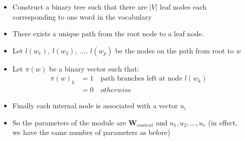 \begin{frame}
	\begin{columns}
		\begin{overlayarea}{\textwidth}{\textheight}
			
		\end{overlayarea}
		\begin{overlayarea}{\textwidth}{\textheight}
			\footnotesize{
				\begin{itemize}
					\justifying
					\item<1-> Construct a binary tree such that there are $|V|$ leaf nodes each corresponding
					      to one word in the vocabulary
					\item<3-> There exists a unique path from the root node to a leaf node.
					\item<4-> Let $l(w_1),\ l(w_2),\ ...,\ l(w_p)$ be the nodes on the path from root to $w$
					\item<5-> Let $\pi(w)$ be a binary vector such that:
					      \footnotesize{\begin{align*}
							      \pi(w)_k & = 1 \quad \text{{path branches left at node }} l(w_k) \\
							               & = 0 \quad otherwise
						      \end{align*}}
					\item<6-> Finally each internal node is associated with a vector $u_i$
					\item<7-> So the parameters of the module are $\mathbf{W}_{context}$ and $u_1, u_2, \dots, u_v$ (in effect, we have the same number of parameters as before)
				\end{itemize}
			}
		\end{overlayarea}
	\end{columns}
\end{frame}


